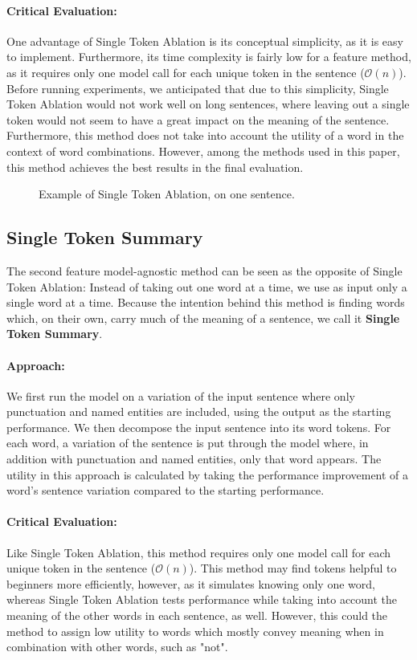 \paragraph{Critical Evaluation:}
One advantage of Single Token Ablation is its conceptual simplicity, as it is easy to implement.
Furthermore, its time complexity is fairly low for a feature method, as it requires only one model call for each unique token in the sentence ($\mathcal{O}(n)$).
Before running experiments, we anticipated that due to this simplicity, Single Token Ablation would not work well on long sentences, where leaving out a single token would not seem to have a great impact on the meaning of the sentence.
Furthermore, this method does not take into account the utility of a word in the context of word combinations.
However, among the methods used in this paper, this method achieves the best results in the final evaluation.

\begin{figure}[H]
	
	\caption{Example of Single Token Ablation, on one sentence.}
	\label{fig:single-token-ablation}
\end{figure}

\subsection{Single Token Summary}
The second feature model-agnostic method can be seen as the opposite of Single Token Ablation:
Instead of taking out one word at a time, we use as input only a single word at a time.
Because the intention behind this method is finding words which, on their own, carry much of the meaning of a sentence, we call it \textbf{Single Token Summary}.

\paragraph{Approach:}
We first run the model on a variation of the input sentence where only punctuation and named entities are included, using the output as the starting performance.
We then decompose the input sentence into its word tokens.
For each word, a variation of the sentence is put through the model where, in addition with punctuation and named entities, only that word appears.
The utility in this approach is calculated by taking the performance improvement of a word's sentence variation compared to the starting performance.

\paragraph{Critical Evaluation:}
Like Single Token Ablation, this method requires only one model call for each unique token in the sentence ($\mathcal{O}(n)$).
This method may find tokens helpful to beginners more efficiently, however, as it simulates knowing only one word, whereas Single Token Ablation tests performance while taking into account the meaning of the other words in each sentence, as well.
However, this could the method to assign low utility to words which mostly convey meaning when in combination with other words, such as "not".

